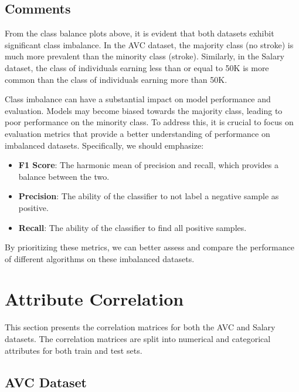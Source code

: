 \documentclass[a4paper,12pt]{article}
\begin{document}
\subsection{Comments}
From the class balance plots above, it is evident that both datasets exhibit significant class imbalance. In the AVC dataset, the majority class (no stroke) is much more prevalent than the minority class (stroke). Similarly, in the Salary dataset, the class of individuals earning less than or equal to 50K is more common than the class of individuals earning more than 50K.

Class imbalance can have a substantial impact on model performance and evaluation. Models may become biased towards the majority class, leading to poor performance on the minority class. To address this, it is crucial to focus on evaluation metrics that provide a better understanding of performance on imbalanced datasets. Specifically, we should emphasize:

\begin{itemize}
    \item \textbf{F1 Score}: The harmonic mean of precision and recall, which provides a balance between the two.
    \item \textbf{Precision}: The ability of the classifier to not label a negative sample as positive.
    \item \textbf{Recall}: The ability of the classifier to find all positive samples.
\end{itemize}

By prioritizing these metrics, we can better assess and compare the performance of different algorithms on these imbalanced datasets.

\newpage

\section{Attribute Correlation}
This section presents the correlation matrices for both the AVC and Salary datasets. The correlation matrices are split into numerical and categorical attributes for both train and test sets.

\subsection{AVC Dataset}
\end{document}
